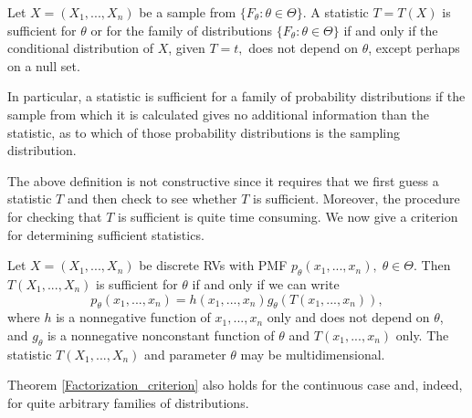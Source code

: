 \documentclass{tufte-handout}
\begin{document}
  \begin{definition}[Sufficient]
    Let $X =( X_1, ..., X_n)$ be a sample from $\{F_\theta : \theta \in \Theta\}$. A statistic $T = T(X)$ is sufficient for $\theta $ or for the family of distributions $\{F_\theta : \theta \in \Theta\}$ if and only if the conditional distribution of $X$, given $T = t,$ does not depend on $\theta$, except perhaps on a null set. 

In particular, a statistic is sufficient for a family of probability distributions if the sample from which it is calculated gives no additional information than the statistic, as to which of those probability distributions is the sampling distribution.
  \end{definition}
The above definition is not constructive since it requires that we first guess a
statistic $T$ and then check to see whether $T$ is sufficient. Moreover, the procedure for checking that $T$ is sufficient is quite time consuming. We now give a criterion for
determining sufficient statistics.

\begin{theorem} \label{Factorization_criterion}
  Let $X = (X_1, ..., X_n)$ be discrete RVs with PMF $p_\theta (x_1,...,x_n), \; \theta \in \Theta$. Then $T(X_1, ..., X_n)$ is sufficient for $\theta$ if and only if we can write
  $$p_\theta (x_1,...,x_n)= h (x_1,...,x_n) g_\theta (T(x_1,..., x_n)),  $$
  where $h$ is a nonnegative function of $x_1,... , x_n$ only and does not depend on $\theta$,
and $g_\theta$ is a nonnegative nonconstant function of $\theta$ and $T(x_1,... ,x_n)$ only. The
statistic $T(X_1,...,X_n)$ and parameter $\theta$ may be multidimensional.
\end{theorem}
\begin{remark} 
  Theorem \ref{Factorization_criterion} also holds for the continuous case and, indeed, for quite
arbitrary families of distributions.
\end{remark}
\end{document}
